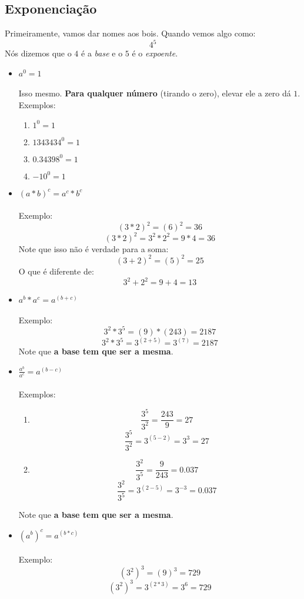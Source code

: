 \documentclass{article}
\begin{document}
\subsection{Exponenciação}
Primeiramente, vamos dar nomes aos bois. Quando vemos algo como:
$$4^5$$
Nós dizemos que o $4$ é a \textit{base} e o $5$ é o \textit{expoente}.
\begin{itemize}
	\item $a^0 = 1$
	\paragraph{}
	Isso mesmo. \textbf{Para qualquer número} (tirando o zero), elevar ele
	a zero dá $1$. Exemplos:
	\begin{enumerate}
		\item $1^0 = 1$
		\item $1343434^0 = 1$
		\item $0.34398^0 = 1$
		\item ${-10}^0 = 1$
	\end{enumerate}
	\item ${(a*b)}^c = a^c*b^c$
	\paragraph{}
	Exemplo:
	$${(3*2)}^2 = {(6)}^2 = 36$$
	$${(3*2)}^2 = 3^2*2^2 = 9*4 = 36$$
	Note que isso não é verdade para a soma:
	$${(3+2)}^2 = {(5)}^2 = 25$$
	O que é diferente de:
	$$3^2 + 2^2 = 9 + 4 = 13$$
	\item $a^b*a^c = a^{(b + c)}$
	\paragraph{}
	Exemplo:
	$$3^2*3^5 = (9)*(243) = 2187$$	
	$$3^2*3^5 = 3^{(2 + 5)} = 3^{(7)} = 2187$$	
	Note que \textbf{a base tem que ser a mesma}.
	\item $\frac{a^b}{a^c} = a^{(b - c)}$
	\paragraph{}
	Exemplos:
	\begin{enumerate}
		\item 
		$$\frac{3^5}{3^2} = \frac{243}{9} = 27$$	
		$$\frac{3^5}{3^2} = 3^{(5-2)} = 3^3 = 27$$	
		\item
		$$\frac{3^2}{3^5} = \frac{9}{243} = 0.037$$	
		$$\frac{3^2}{3^5} = 3^{(2-5)} = 3^{-3} = 0.037$$	
	\end{enumerate}
	Note que \textbf{a base tem que ser a mesma}.
	\item ${(a^b)}^c = a^{(b*c)}$
	\paragraph{}
	Exemplo:
	$${(3^2)}^3 = {(9)}^3 = 729$$
	$${(3^2)}^3 = 3^{(2*3)} = 3^6 = 729$$
\end{itemize}
\end{document}
